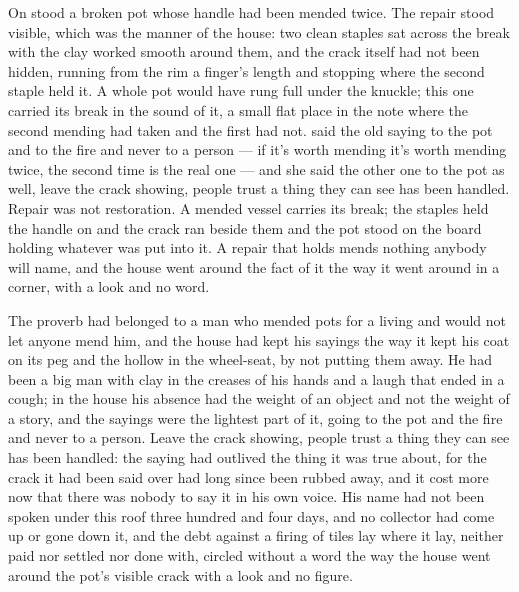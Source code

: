 On  stood a broken pot whose handle had been mended twice. The repair stood visible, which was the manner of the house: two clean staples sat across the break with the clay worked smooth around them, and the crack itself had not been hidden, running from the rim a finger's length and stopping where the second staple held it. A whole pot would have rung full under the knuckle; this one carried its break in the sound of it, a small flat place in the note where the second mending had taken and the first had not.  said the old saying to the pot and to the fire and never to a person --- if it's worth mending it's worth mending twice, the second time is the real one --- and she said the other one to the pot as well, leave the crack showing, people trust a thing they can see has been handled. Repair was not restoration. A mended vessel carries its break; the staples held the handle on and the crack ran beside them and the pot stood on the board holding whatever was put into it. A repair that holds mends nothing anybody will name, and the house went around the fact of it the way it went around  in a corner, with a look and no word.

The proverb had belonged to a man who mended pots for a living and would not let anyone mend him, and the house had kept his sayings the way it kept his coat on its peg and the hollow in the wheel-seat, by not putting them away. He had been a big man with clay in the creases of his hands and a laugh that ended in a cough; in the house his absence had the weight of an object and not the weight of a story, and the sayings were the lightest part of it, going to the pot and the fire and never to a person. Leave the crack showing, people trust a thing they can see has been handled: the saying had outlived the thing it was true about, for the crack it had been said over had long since been rubbed away, and it cost more now that there was nobody to say it in his own voice. His name had not been spoken under this roof three hundred and four days, and no collector had come up  or gone down it, and the debt against a firing of tiles lay where it lay, neither paid nor settled nor done with, circled without a word the way the house went around the pot's visible crack with a look and no figure.

